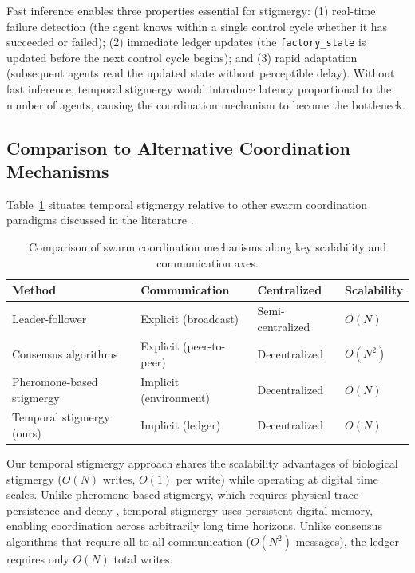 \documentclass[12pt,a4paper,oneside]{report}
\begin{document}
Fast inference enables three properties essential for stigmergy: (1) real-time failure detection (the agent knows within a single control cycle whether it has succeeded or failed); (2) immediate ledger updates (the \texttt{factory\_state} is updated before the next control cycle begins); and (3) rapid adaptation (subsequent agents read the updated state without perceptible delay). Without fast inference, temporal stigmergy would introduce latency proportional to the number of agents, causing the coordination mechanism to become the bottleneck.

\subsection{Comparison to Alternative Coordination Mechanisms}
\label{subsec:comparison_to_alternative_coordination_mechanisms}

Table~\ref{tab:coordination_comparison} situates temporal stigmergy relative to other swarm coordination paradigms discussed in the literature \cite{bongard2006resilient, cully2015robots, domberg2026selfadapting}.

\begin{table}[H]
\centering
\small
\setlength{\tabcolsep}{4pt}
\caption{Comparison of swarm coordination mechanisms along key scalability and communication axes.}
\label{tab:coordination_comparison}
\begin{tabular}{>{\raggedright\arraybackslash}p{4.0cm} >{\raggedright\arraybackslash}p{4.0cm} >{\centering\arraybackslash}p{2.6cm} >{\centering\arraybackslash}p{2.6cm}}
\toprule
\textbf{Method} & \textbf{Communication} & \textbf{Centralized} & \textbf{Scalability} \\
\midrule
Leader-follower & Explicit (broadcast) & Semi-centralized & $O(N)$ \\
Consensus algorithms & Explicit (peer-to-peer) & Decentralized & $O(N^2)$ \\
Pheromone-based stigmergy & Implicit (environment) & Decentralized & $O(N)$ \\
Temporal stigmergy (ours) & Implicit (ledger) & Decentralized & $O(N)$ \\
\bottomrule
\end{tabular}
\end{table}

Our temporal stigmergy approach shares the scalability advantages of biological stigmergy ($O(N)$ writes, $O(1)$ per write) while operating at digital time scales. Unlike pheromone-based stigmergy, which requires physical trace persistence and decay \cite{bongard2006resilient}, temporal stigmergy uses persistent digital memory, enabling coordination across arbitrarily long time horizons. Unlike consensus algorithms that require all-to-all communication ($O(N^2)$ messages), the ledger requires only $O(N)$ total writes.
\end{document}
